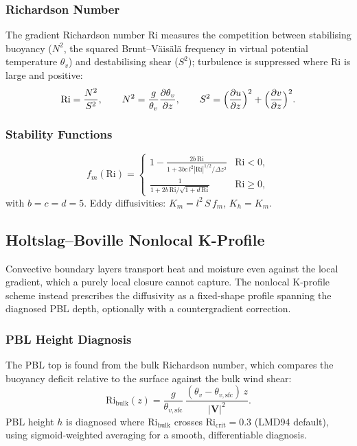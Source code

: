 \documentclass[11pt,twoside]{report}
\newcommand{\pp}{\partial}
\newcommand{\vect}[1]{\bm{#1}}
\begin{document}
\subsubsection{Richardson Number}

The gradient Richardson number $\mathrm{Ri}$ measures the competition between
stabilising buoyancy ($N^2$, the squared Brunt--V\"ais\"al\"a frequency in
virtual potential temperature $\theta_v$) and destabilising shear ($S^2$);
turbulence is suppressed where $\mathrm{Ri}$ is large and positive:
\begin{equation}
  \mathrm{Ri} = \frac{N^2}{S^2}, \qquad
  N^2 = \frac{g}{\theta_v}\frac{\pp\theta_v}{\pp z}, \qquad
  S^2 = \Bigl(\frac{\pp u}{\pp z}\Bigr)^2
  +\Bigl(\frac{\pp v}{\pp z}\Bigr)^2.
\end{equation}

\subsubsection{Stability Functions}
\begin{equation}
  f_m(\mathrm{Ri}) = \begin{cases}
    \displaystyle 1-\frac{2b\,\mathrm{Ri}}
    {1+3bc\,l^2|\mathrm{Ri}|^{1/2}/\Delta z^2} & \mathrm{Ri}<0,\\[8pt]
    \displaystyle \frac{1}{1+2b\,\mathrm{Ri}/\sqrt{1+d\,\mathrm{Ri}}}
    & \mathrm{Ri}\ge 0,
  \end{cases}
\end{equation}
with $b=c=d=5$.  Eddy diffusivities: $K_m=l^2\,S\,f_m$, $K_h=K_m$.

\subsection{Holtslag--Boville Nonlocal K-Profile}

Convective boundary layers transport heat and moisture even against the local
gradient, which a purely local closure cannot capture. The nonlocal
K-profile scheme \citep{HoltslagBoville1993} instead prescribes the
diffusivity as a fixed-shape profile spanning the diagnosed PBL depth,
optionally with a countergradient correction.

\subsubsection{PBL Height Diagnosis}

The PBL top is found from the bulk Richardson number, which compares the
buoyancy deficit relative to the surface against the bulk wind shear:
\begin{equation}
  \mathrm{Ri}_{\mathrm{bulk}}(z) = \frac{g}{\theta_{v,\mathrm{sfc}}}\,
  \frac{(\theta_v-\theta_{v,\mathrm{sfc}})\,z}{|\vect{V}|^2}.
\end{equation}
PBL height $h$ is diagnosed where $\mathrm{Ri}_{\mathrm{bulk}}$
crosses $\mathrm{Ri}_{\mathrm{crit}}=0.3$ (LMD94 default), using
sigmoid-weighted averaging for a smooth, differentiable diagnosis.
\end{document}
